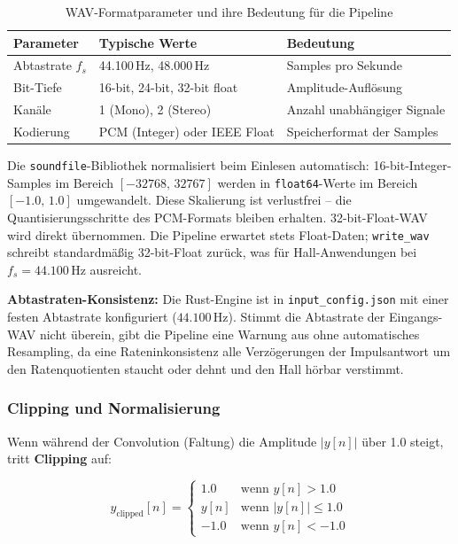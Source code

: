 \begin{table}[H]
    \centering
    \begin{tabular}{|l|l|p{5cm}|}
        \hline
        \textbf{Parameter} & \textbf{Typische Werte} & \textbf{Bedeutung} \\
        \hline
        Abtastrate $f_s$ & 44.100\,Hz, 48.000\,Hz & Samples pro Sekunde \\
        \hline
        Bit-Tiefe & 16-bit, 24-bit, 32-bit float & Amplitude-Aufl\"osung \\
        \hline
        Kan\"ale & 1 (Mono), 2 (Stereo) & Anzahl unabh\"angiger Signale \\
        \hline
        Kodierung & PCM (Integer) oder IEEE Float & Speicherformat der Samples \\
        \hline
    \end{tabular}
    \caption{WAV-Formatparameter und ihre Bedeutung f\"ur die Pipeline}
\end{table}

Die \texttt{soundfile}-Bibliothek normalisiert beim Einlesen automatisch:
16-bit-Integer-Samples im Bereich $[-32768,\,32767]$ werden in \texttt{float64}-Werte
im Bereich $[-1.0,\,1.0]$ umgewandelt. Diese Skalierung ist verlustfrei -- die
Quantisierungsschritte des PCM-Formats bleiben erhalten. 32-bit-Float-WAV
wird direkt \"ubernommen. Die Pipeline erwartet stets Float-Daten; \texttt{write\_wav}
schreibt standardm\"a\ss{}ig 32-bit-Float zur\"uck, was f\"ur Hall-Anwendungen
bei $f_s = 44.100$\,Hz ausreicht.

\textbf{Abtastraten-Konsistenz:} Die Rust-Engine ist in \texttt{input\_config.json}
mit einer festen Abtastrate konfiguriert ($44.100$\,Hz).
Stimmt die Abtastrate der Eingangs-WAV nicht \"uberein, gibt die Pipeline eine Warnung aus
ohne automatisches Resampling, da eine Rateninkonsistenz alle Verzögerungen
der Impulsantwort um den Ratenquotienten staucht oder dehnt und den Hall
hörbar verstimmt.

\subsubsection{Clipping und Normalisierung}

Wenn w\"ahrend der Convolution (Faltung) die Amplitude $|y[n]|$ \"uber 1.0 steigt, tritt \textbf{Clipping} auf:

$$y_{\text{clipped}}[n] = \begin{cases}
    1.0 & \text{wenn } y[n] > 1.0 \\
    y[n] & \text{wenn } |y[n]| \leq 1.0 \\
    -1.0 & \text{wenn } y[n] < -1.0
\end{cases}$$

